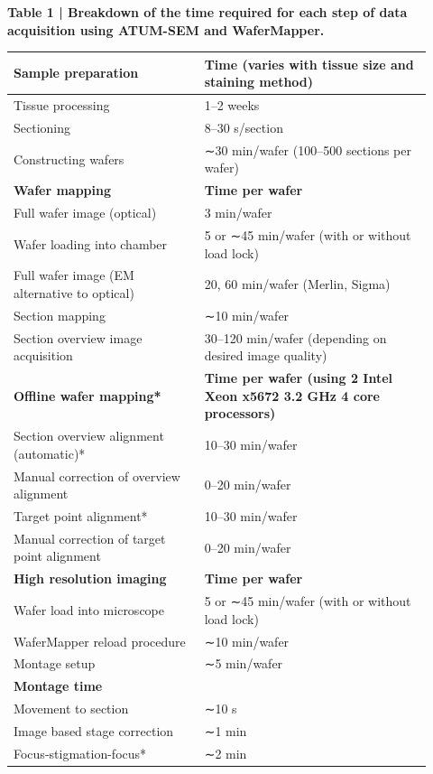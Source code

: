 \documentclass{article}
\begin{document}
\begin{center}\small
\noindent\textbf{Table 1 | Breakdown of the time required for each step of data acquisition using ATUM-SEM and WaferMapper.}\par\medskip
\begin{tabular}{p{0.42\linewidth}p{0.5\linewidth}}
\toprule
\textbf{Sample preparation} & \textbf{Time (varies with tissue size and staining method)}\\
\midrule
Tissue processing & 1–2 weeks\\
Sectioning & 8–30 s/section\\
Constructing wafers & ∼30 min/wafer (100–500 sections per wafer)\\
\midrule
\textbf{Wafer mapping} & \textbf{Time per wafer}\\
\midrule
Full wafer image (optical) & 3 min/wafer\\
Wafer loading into chamber & 5 or ∼45 min/wafer (with or without load lock)\\
Full wafer image (EM alternative to optical) & 20, 60 min/wafer (Merlin, Sigma)\\
Section mapping & ∼10 min/wafer\\
Section overview image acquisition & 30–120 min/wafer (depending on desired image quality)\\
\midrule
\textbf{Offline wafer mapping*} & \textbf{Time per wafer (using 2 Intel Xeon x5672 3.2 GHz 4 core processors)}\\
\midrule
Section overview alignment (automatic)* & 10–30 min/wafer\\
Manual correction of overview alignment & 0–20 min/wafer\\
Target point alignment* & 10–30 min/wafer\\
Manual correction of target point alignment & 0–20 min/wafer\\
\midrule
\textbf{High resolution imaging} & \textbf{Time per wafer}\\
\midrule
Wafer load into microscope & 5 or ∼45 min/wafer (with or without load lock)\\
WaferMapper reload procedure & ∼10 min/wafer\\
Montage setup & ∼5 min/wafer\\
\midrule
\textbf{Montage time} & \\
\midrule
Movement to section & ∼10 s\\
Image based stage correction & ∼1 min\\
Focus-stigmation-focus* & ∼2 min\\

\end{tabular}
\end{center}
\end{document}
